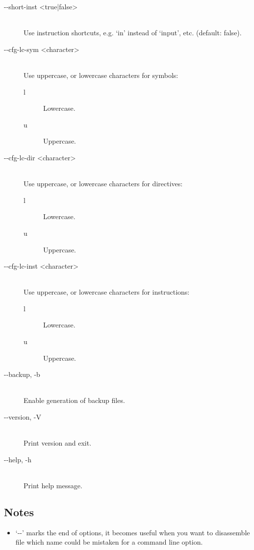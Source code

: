 \begin{description}
            \item[-{}-short-inst <true|false>]~\\
                Use instruction shortcuts, e.g. `in' instead of `input', etc. (default: false).

            \item[-{}-cfg-lc-sym <character>]~\\
                Use uppercase, or lowercase characters for symbols:
                \begin{description}
                    \item [l] Lowercase.
                    \item [u] Uppercase.
                \end{description}

            \item[-{}-cfg-lc-dir <character>]~\\
                Use uppercase, or lowercase characters for directives:
                \begin{description}
                    \item [l] Lowercase.
                    \item [u] Uppercase.
                \end{description}

            \item[-{}-cfg-lc-inst <character>]~\\
                Use uppercase, or lowercase characters for instructions:
                \begin{description}
                    \item [l] Lowercase.
                    \item [u] Uppercase.
                \end{description}

            \item[-{}-backup, -b]~\\
                Enable generation of backup files.

            \item[-{}-version, -V]~\\
                Print version and exit.

            \item[-{}-help, -h]~\\
                Print help message.
        \end{description}

    \subsection{Notes}
        \begin{itemize}
            \item `-{}-' marks the end of options, it becomes useful when you want to disassemble file which name could be mistaken for a command line option.
        \end{itemize}

